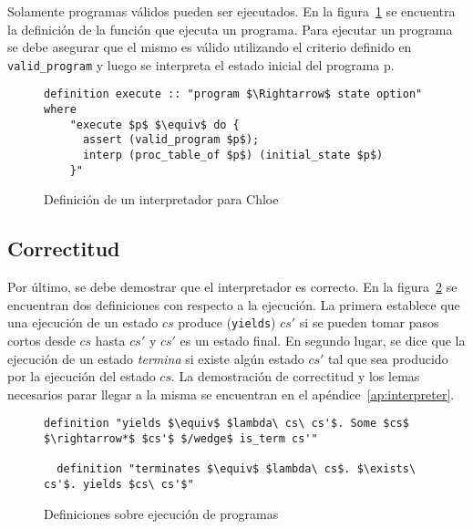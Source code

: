 Solamente programas válidos pueden ser ejecutados.
En la figura~\ref{fig:execute_def} se encuentra la definición de la función que ejecuta un programa.
Para ejecutar un programa se debe asegurar que el mismo es válido utilizando el criterio definido en \verb|valid_program| y luego se interpreta el estado inicial del programa p.

\begin{figure}
  \begin{lstlisting}[frame=single, mathescape=true]
  definition execute :: "program $\Rightarrow$ state option" where
    "execute $p$ $\equiv$ do {
      assert (valid_program $p$);
      interp (proc_table_of $p$) (initial_state $p$)
    }"
  \end{lstlisting}

  \caption{Definición de un interpretador para Chloe}
  \label{fig:execute_def}
\end{figure}


\subsection{Correctitud}\label{subsection:correctness}

Por último, se debe demostrar que el interpretador es correcto.
En la figura~\ref{fig:execution_definitions} se encuentran dos definiciones con respecto a la ejecución.
La primera establece que una ejecución de un estado $cs$ produce (\verb|yields|) $cs'$ si se pueden tomar pasos cortos desde $cs$ hasta $cs'$ y $cs'$ es un estado final.
En segundo lugar, se dice que la ejecución de un estado \textit{termina} si existe algún estado $cs'$ tal que sea producido por la ejecución del estado $cs$.
La demostración de correctitud y los lemas necesarios parar llegar a la misma se encuentran en el apéndice~\ref{ap:interpreter}.

\begin{figure}
  \begin{lstlisting}[frame=single, mathescape=true]
  definition "yields $\equiv$ $lambda\ cs\ cs'$. Some $cs$ $\rightarrow*$ $cs'$ $/wedge$ is_term cs'"

  definition "terminates $\equiv$ $lambda\ cs$. $\exists\ cs'$. yields $cs\ cs'$"
  \end{lstlisting}

  \caption{Definiciones sobre ejecución de programas}
  \label{fig:execution_definitions}
\end{figure}

